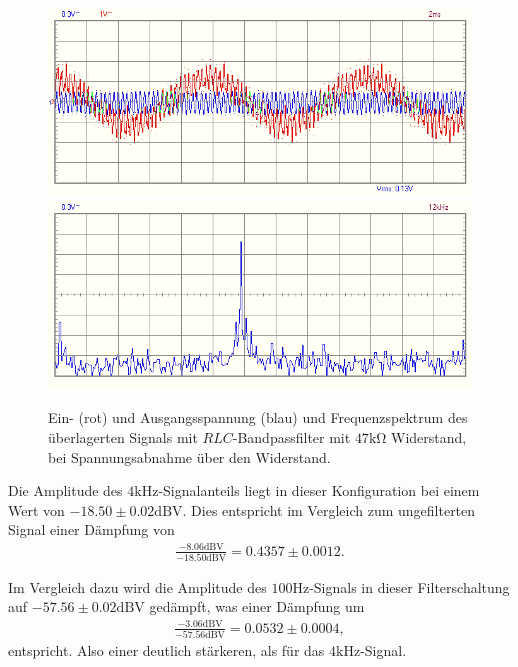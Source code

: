\begin{figure}[H]
  \centering
  \includegraphics[width=.8\textwidth]{files/aufgabe8_teil3_clR_47ohm_bandpass_oszi.png}
  \includegraphics[width=.8\textwidth]{files/aufgabe8_teil3_clR_47ohm_bandpass_spectrum.png}
  \caption{Ein- (rot) und Ausgangsspannung (blau) und Frequenzspektrum des überlagerten Signals mit $RLC$-Bandpassfilter mit $47\si{\kilo\ohm}$ Widerstand, bei Spannungsabnahme über den Widerstand.}
  \label{fig:aufgabe8_teil3_clR_47ohm_bandpass}
\end{figure}
\newpage\noindent
Die Amplitude des $4\si{\kilo\hertz}$-Signalanteils liegt in dieser Konfiguration bei einem Wert von $-18.50 \pm 0.02 \mathrm{dBV}$. Dies entspricht im Vergleich zum ungefilterten Signal einer Dämpfung von
\begin{align}
  \frac{-8.06\mathrm{dBV}}{-18.50\mathrm{dBV}} = 0.4357 \pm 0.0012.
\end{align}

Im Vergleich dazu wird die Amplitude des $100\si{\hertz}$-Signals in dieser Filterschaltung auf $-57.56 \pm 0.02 \mathrm{dBV}$ gedämpft, was einer Dämpfung um
\begin{align}
  \frac{-3.06\mathrm{dBV}}{-57.56\mathrm{dBV}} = 0.0532 \pm 0.0004,
\end{align}
entspricht. Also einer deutlich stärkeren, als für das $4\si{\kilo\hertz}$-Signal.
